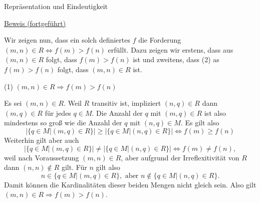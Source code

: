 \documentclass[
  8pt,
  ignorenonframetext,
]{beamer}
\begin{document}
\begin{frame}{Repräsentation und Eindeutigkeit}
\protect\hypertarget{repruxe4sentation-und-eindeutigkeit-3}{}
\footnotesize

\underline{Beweis (fortgeführt)}

Wir zeigen nun, dass ein solch definiertes \(f\) die Forderung
\((m,n) \in R \Leftrightarrow f(m)>f(n)\) erfüllt. Dazu zeigen wir
erstens, dass aus \((m,n) \in R\) folgt, dass \(f(m)>f(n)\) ist und
zweitens, dass (2) as \(f(m)>f(n)\) folgt, dass \((m,n) \in R\) ist.

\noindent (1) \((m,n) \in R \Rightarrow f(m)>f(n)\)

Es sei \((m,n) \in R\). Weil \(R\) transitiv ist, impliziert
\((n,q) \in R\) dann \((m,q) \in R\) für jedes \(q \in M\). Die Anzahl
der \(q\) mit \((m,q) \in R\) ist also mindestens so groß wie die Anzahl
der \(q\) mit \((n,q) \in M\). Es gilt also \begin{equation}
|\{q \in M|(m,q) \in R\}| \ge |\{q \in M|(n,q) \in R\}| \Leftrightarrow f(m) \ge f(n)
\end{equation} Weiterhin gilt aber auch \begin{equation}
|\{q \in M|(m,q) \in R\}| \neq |\{q \in M|(n,q) \in R\}| \Leftrightarrow f(m) \neq f(n),
\end{equation} weil nach Voraussetzung \((m,n) \in R\), aber aufgrund
der Irreflexitivität von \(R\) dann \((n,n) \notin R\) gilt. Für \(n\)
gilt also \begin{equation}
n \in \{q \in M|(m,q) \in R\}, \mbox{ aber } n \notin \{q \in M|(n,q) \in R\}.
\end{equation} Damit können die Kardinalitäten dieser beiden Mengen
nicht gleich sein. Also gilt \((m,n) \in R \Rightarrow f(m)>f(n)\).
\end{frame}
\end{document}
